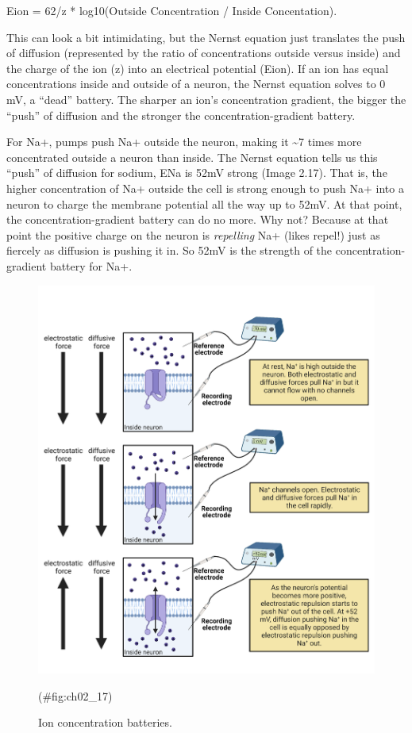 \documentclass[
]{book}
\begin{document}
Eion = 62/z * log10(Outside Concentration / Inside Concentation).

This can look a bit intimidating, but the Nernst equation just translates the push of diffusion (represented by the ratio of concentrations outside versus inside) and the charge of the ion (z) into an electrical potential (Eion). If an ion has equal concentrations inside and outside of a neuron, the Nernst equation solves to 0 mV, a ``dead'' battery. The sharper an ion's concentration gradient, the bigger the ``push'' of diffusion and the stronger the concentration-gradient battery.

For Na+, pumps push Na+ outside the neuron, making it \textasciitilde7 times more concentrated outside a neuron than inside. The Nernst equation tells us this ``push'' of diffusion for sodium, ENa is 52mV strong (Image 2.17). That is, the higher concentration of Na+ outside the cell is strong enough to push Na+ into a neuron to charge the membrane potential all the way up to 52mV. At that point, the concentration-gradient battery can do no more. Why not? Because at that point the positive charge on the neuron is \emph{repelling} Na+ (likes repel!) just as fiercely as diffusion is pushing it in. So 52mV is the strength of the concentration-gradient battery for Na+.

\begin{figure}

{\centering \includegraphics[width=0.8\linewidth]{images/ch02/02_17} 

}

\caption{Ion concentration batteries.}(\#fig:ch02_17)
\end{figure}
\end{document}

